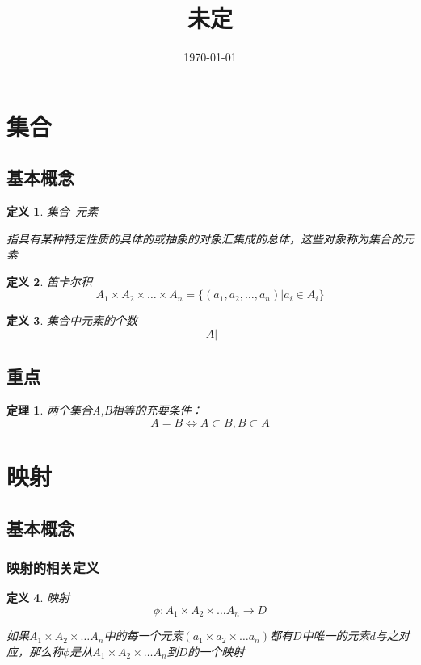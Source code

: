 \documentclass[a4paper]{ctexart}
\title{未定}
\date{\today}
\newtheorem{theorem}{定理}[section]
\newtheorem{definition}{定义}[subsection]
\begin{document}
	\maketitle

	\tableofcontents
\section{集合}
	\subsection{基本概念}
	\begin{definition}
	集合\ 元素
	
	指具有某种特定性质的具体的或抽象的对象汇集成的总体，这些对象称为集合的元素
	

	\end{definition}
	\begin{definition}{笛卡尔积}
	\[ A_1\times A_2 \times \dots \times A_n=\{(a_1,a_2,\dots,a_n)|a_i\in A_i\}\]
	\end{definition}

	\begin{definition}
		集合中元素的个数\[|A|\]
	\end{definition}


	\subsection{重点}
	\begin{theorem}
	两个集合A,B相等的充要条件：\[A=B\iff A\subset B,B\subset A\]
	\end{theorem}

\section{映射}
	\subsection{基本概念}
		\subsubsection{映射的相关定义}
	\begin{definition}
		映射
		\[\phi{:}A_1\times A_2\times \dots A_n \to D\]
		
		如果$A_1\times A_2\times \dots A_n$中的每一个元素$(a_1\times a_2\times \dots a_n)$都有$D$中唯一的元素$d$与之对应，那么称$\phi $是从$A_1\times A_2\times \dots A_n$到$D$的一个映射
	\end{definition}
\end{document}
